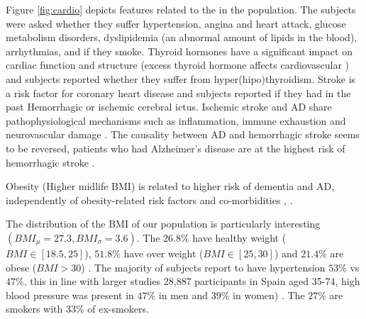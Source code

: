 \documentclass[11pt]{article}
\theoremstyle{definition}
\theoremstyle{remark}
\begin{document}
Figure \ref{fig:cardio} depicts features related to the in the population. The subjects were asked whether they suffer hypertension, angina and heart attack, glucose metabolism disorders, dyslipidemia (an abnormal amount of lipids in the blood), arrhythmias, and if they smoke. 
Thyroid hormones have a significant impact on cardiac function and structure (excess thyroid hormone affects cardiovascular \cite{klein2007thyroid}) and subjects reported whether they suffer from hyper(hipo)thyroidism.
Stroke is a risk factor for coronary heart disease and subjects reported if they had in the past  Hemorrhagic or ischemic cerebral ictus. Ischemic stroke and AD share pathophysiological mechanisms such as inflammation, immune exhaustion and neurovascular damage \cite{lucke2015common}. 
The causality between AD and hemorrhagic stroke seems to be reversed, patients who had Alzheimer's disease are at the highest risk of hemorrhagic stroke \cite{wang2014newly}.

Obesity (Higher midlife BMI) is related to higher risk of dementia and AD, independently of obesity-related risk factors and co-morbidities \cite{tolppanen2014midlife}, \cite{nepal2014rising}. 

The distribution of the BMI of our population is particularly interesting $(BMI_{\mu}=27.3, BMI_{\sigma}=3.6)$. The $26.8\%$ have healthy weight ($BMI \in [18.5, 25]$), $51.8\%$ have over weight ($BMI \in [25,30]$) and $21.4\%$ are obese ($BMI > 30$) \cite{lacruz2015prevalence}. 
The majority of subjects report to have hypertension $53\%$ vs $47\%$, this in line with larger studies 28,887 participants in Spain aged 35-74, high blood pressure was present in $47\%$ in men and $39\%$ in women) \cite{grau2011cardiovascular}.
The $27\%$ are smokers with $33\%$ of ex-smokers.

\end{document}
